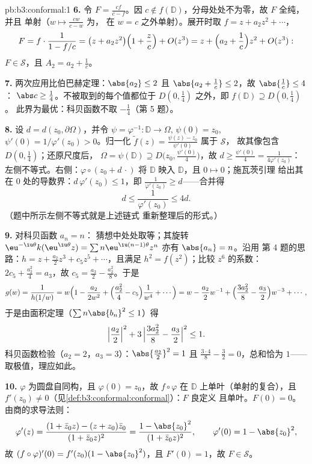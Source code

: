 \begin{solution}{pb:b3:conformal:1}
\textbf{6.} 令 $F = \frac{cf}{c - f}$。因 $c \notin f(\mathbb
D)$，分母处处不为零，故 $F$ 全纯，并且
单射（$w \mapsto \frac{cw}{c - w}$ 为，
在 $w = c$ 之外单射）。展开时取 $f = z + a_2z^2 + \cdots$，
\[
F = f\cdot\frac1{1 - f/c} = \bigl(z + a_2z^2\bigr)\Bigl(1 +
\frac zc\Bigr) + O(z^3)
= z + \Bigl(a_2 + \frac1c\Bigr)z^2 + O(z^3):
\]
$F \in \mathcal S$，且 $A_2 = a_2 + \frac1c$。

\textbf{7.} 两次应用比伯巴赫定理：$\abs{a_2} \leq 2$ 且
$\abs{a_2 + \frac1c} \leq 2$，故 $\abs{\frac1c} \leq 4$：
$\abs c \geq \frac14$。不被取到的每个值都位于
$D(0,\frac14)$ 之外，即 $f(\mathbb D) \supseteq D(0, \frac14)$。
此界为最优：科贝函数不取 $-\frac14$（第 5 题）。

\textbf{8.} 设 $d = d(z_0, \partial\Omega)$，并令 $\psi =
\varphi^{-1} \colon \mathbb D \to \Omega$, $\psi(0) = z_0$,
$\psi'(0) = 1/\varphi'(z_0) > 0$。归一化 $\tilde
f(z) = \frac{\psi(z) - z_0}{\psi'(0)}$ 属于 $\mathcal S$，
故其像包含 $D(0, \frac14)$；还原尺度后，
$\Omega = \psi(\mathbb D) \supseteq D\bigl(z_0,
\tfrac{\psi'(0)}4\bigr)$，故 $d \geq \frac{\psi'(0)}4 =
\frac1{4\varphi'(z_0)}$：左侧不等式。右侧：$\varphi\circ(z_0 + d\,\cdot)$
将 $\mathbb D$ 映入 $\mathbb D$，且 $0 \mapsto 0$；施瓦茨引理
给出其在 $0$ 处的导数界：$d\,\varphi'(z_0) \leq 1$，即
$\frac1{\varphi'(z_0)} \geq d$——合并得
\[
d \leq \frac1{\varphi'(z_0)} \leq 4d .
\]
（题中所示左侧不等式就是上述链式
重新整理后的形式。）

\textbf{9.} 对科贝函数 $a_n = n$：
猜想中处处取等；其旋转
$\eu^{-\iu\theta}k(\eu^{\iu\theta}z) = \sum
n\eu^{\iu(n-1)\theta}z^n$ 亦有 $\abs{a_n} = n$。沿用
第 4 题的思路：$h = z + \frac{a_2}2z^3 + c_5z^5 + \cdots$，且满足
$h^2 = f(z^2)$；比较 $z^6$ 的系数：$2c_5 +
\frac{a_2^2}4 = a_3$，故 $c_5 = \frac{a_3}2 -
\frac{a_2^2}8$。于是
\[
g(w) = \frac1{h(1/w)} = w\Bigl(1 - \frac{a_2}{2w^2} +
\Bigl(\frac{a_2^2}4 - c_5\Bigr)\frac1{w^4} + \cdots\Bigr)
= w - \frac{a_2}2w^{-1} + \Bigl(\frac{3a_2^2}8 -
\frac{a_3}2\Bigr)w^{-3} + \cdots,
\]
于是由面积定理（$\sum n\abs{b_n}^2 \leq 1$）得
\[
\Bigl|\frac{a_2}2\Bigr|^2 + 3\,\Bigl|\frac{3a_2^2}8 -
\frac{a_3}2\Bigr|^2 \leq 1 .
\]
科贝函数检验（$a_2 = 2$，$a_3 = 3$）：$\abs{\frac{a_2}2}^2 = 1$
且 $\frac{3\cdot4}8 - \frac32 = 0$，总和恰为 $1$——
取极值，理应如此。

\textbf{10.} $\varphi$ 为圆盘自同构，且
$\varphi(0) = z_0$，故 $f\circ\varphi$ 在
$\mathbb D$ 上单叶（单射的复合），且 $f'(z_0) \neq
0$（见\cref{def:b3:conformal:conformal}）：$F$ 良定义
且单叶。$F(0) = 0$。由商的求导法则：
\[
\varphi'(z) = \frac{(1 + \bar z_0z) - (z + z_0)\bar z_0}
{(1 + \bar z_0z)^2}
= \frac{1 - \abs{z_0}^2}{(1 + \bar z_0z)^2},
\qquad \varphi'(0) = 1 - \abs{z_0}^2 ,
\]
故 $(f\circ\varphi)'(0) = f'(z_0)(1 - \abs{z_0}^2)$，且
$F'(0) = 1$，故 $F \in \mathcal S$。


\end{solution}
